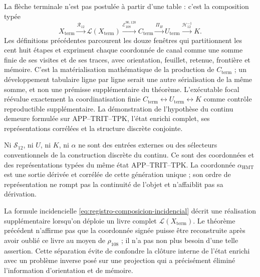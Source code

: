 \begin{remark}
La flèche terminale n’est pas postulée à partir d’une table : c’est la composition
typée
\[
 X_{\mathrm{term}}
 \xrightarrow{\mathcal R_{12}}\mathscr L(X_{\mathrm{term}})
 \xrightarrow{\mathcal E_{108}^{90,120}}C_{\mathrm{term}}
 \xrightarrow{\Pi_H}U_{\mathrm{term}}
 \xrightarrow{\mathcal H_{12}^{-1}}K .
\]
Les définitions précédentes parcourent les douze fenêtres qui partitionnent les cent huit étapes et expriment chaque coordonnée de canal comme une somme finie de ses visites et de ses traces, avec orientation, feuillet, retenue, frontière et mémoire. C'est la matérialisation mathématique de la production de \(C_{\mathrm{term}}\) ; un développement tabulaire ligne par ligne serait une autre sérialisation de la même somme, et non une prémisse supplémentaire du théorème. L'exécutable focal réévalue exactement la coordinatisation finie \(C_{\mathrm{term}}\leftrightarrow U_{\mathrm{term}}\leftrightarrow K\) comme contrôle reproductible supplémentaire. La démonstration de l'hypothèse du continu demeure formulée sur APP--TRIT--TPK, l'état enrichi complet, ses représentations corrélées et la structure discrète conjointe.
\end{remark}

Ni \(\mathcal S_{12}\), ni \(U\), ni \(K\), ni \(\alpha\) ne sont des entrées externes ou des sélecteurs conventionnels de la construction discrète du continu. Ce sont des coordonnées et des représentations typées du même état APP--TRIT--TPK. La coordonnée \(\alpha_{\mathrm{HMT}}\) est une sortie dérivée et corrélée de cette génération unique ; son ordre de représentation ne rompt pas la continuité de l'objet et n'affaiblit pas sa dérivation.

La formule incidencielle \eqref{eq:registro-composicion-incidencial} décrit
une réalisation supplémentaire lorsqu’on déploie un livre complet
\(\mathscr L(X_{\mathrm{term}})\). Le théorème précédent n’affirme pas que la
coordonnée signée puisse être reconstruite après avoir oublié ce livre au moyen de
\(\rho_{108}\) ; il n’a pas non plus besoin d’une telle assertion. Cette séparation évite
de confondre la clôture interne de l’état enrichi avec un problème inverse
posé sur une projection qui a précisément éliminé l’information
d’orientation et de mémoire.

